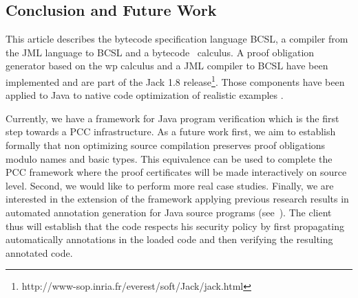 \subsection{Conclusion and Future Work}\label{conclusion}
This article describes the bytecode specification language BCSL, a compiler from the JML language to BCSL and a bytecode \wpi \ calculus.
A proof obligation generator based on the wp calculus and a JML compiler to BCSL have been implemented and are part of the Jack 1.8 release\footnote{http://www-sop.inria.fr/everest/soft/Jack/jack.html}. Those components have been applied to Java to native code optimization of realistic examples \cite{CPG06LFN}.  


Currently, we have a framework for Java program verification which is the first step towards a PCC infrastructure.
 As a future work first, we aim to establish formally that non optimizing source compilation
preserves proof obligations modulo names and basic types. This equivalence can
 be used to complete the PCC framework where the proof certificates will be made interactively on source level. Second, we would like to perform more real case studies. 
Finally, we are interested in 
the extension of the framework applying previous research results in automated annotation generation for Java source programs (see~\cite{PBBHL}). The client thus will establish that the code respects his security policy %
by first propagating automatically annotations in the loaded code and then verifying the resulting annotated code.





